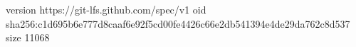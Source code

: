version https://git-lfs.github.com/spec/v1
oid sha256:c1d695b6e777d8caaf6e92f5cd00fe4426c66e2db541394e4de29da762c8d537
size 11068
